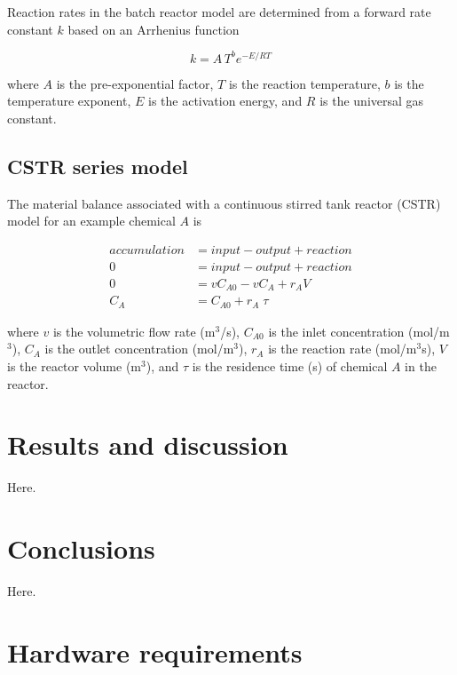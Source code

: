 \documentclass[12pt,titlepage]{article}
\begin{document}
Reaction rates in the batch reactor model are determined from a forward rate constant $k$ based on an Arrhenius function

\begin{equation}
    k = A\,T^b e^{-E / RT}
\end{equation}

\noindent where $A$ is the pre-exponential factor, $T$ is the reaction temperature, $b$ is the temperature exponent, $E$ is the activation energy, and $R$ is the universal gas constant.

\subsection{CSTR series model}

The material balance associated with a continuous stirred tank reactor (CSTR) model for an example chemical $A$ is

\begin{equation}
    \begin{aligned}
        accumulation &= input - output + reaction \\
        0 &= input - output + reaction \\
        0 &= v C_{A0} - v C_A + r_A V \\
        C_A &= C_{A0} + r_A\;\tau
    \end{aligned}
\end{equation}

\noindent where $v$ is the volumetric flow rate (m$^3$/s), $C_{A0}$ is the inlet concentration (mol/m$^3$), $C_A$ is the outlet concentration (mol/m$^3$), $r_A$ is the reaction rate (mol/m$^3$s), $V$ is the reactor volume (m$^3$), and $\tau$ is the residence time (s) of chemical $A$ in the reactor.

\section{Results and discussion}

Here.

\section{Conclusions}

Here.

\section{Hardware requirements}
\end{document}
